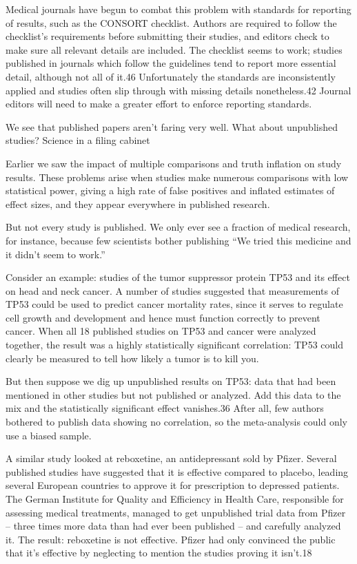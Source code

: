 Medical journals have begun to combat this problem with standards for reporting of results, such as the CONSORT checklist. Authors are required to follow the checklist’s requirements before submitting their studies, and editors check to make sure all relevant details are included. The checklist seems to work; studies published in journals which follow the guidelines tend to report more essential detail, although not all of it.46 Unfortunately the standards are inconsistently applied and studies often slip through with missing details nonetheless.42 Journal editors will need to make a greater effort to enforce reporting standards.

We see that published papers aren’t faring very well. What about unpublished studies?
Science in a filing cabinet

Earlier we saw the impact of multiple comparisons and truth inflation on study results. These problems arise when studies make numerous comparisons with low statistical power, giving a high rate of false positives and inflated estimates of effect sizes, and they appear everywhere in published research.

But not every study is published. We only ever see a fraction of medical research, for instance, because few scientists bother publishing “We tried this medicine and it didn’t seem to work.”

Consider an example: studies of the tumor suppressor protein TP53 and its effect on head and neck cancer. A number of studies suggested that measurements of TP53 could be used to predict cancer mortality rates, since it serves to regulate cell growth and development and hence must function correctly to prevent cancer. When all 18 published studies on TP53 and cancer were analyzed together, the result was a highly statistically significant correlation: TP53 could clearly be measured to tell how likely a tumor is to kill you.

But then suppose we dig up unpublished results on TP53: data that had been mentioned in other studies but not published or analyzed. Add this data to the mix and the statistically significant effect vanishes.36 After all, few authors bothered to publish data showing no correlation, so the meta-analysis could only use a biased sample.

A similar study looked at reboxetine, an antidepressant sold by Pfizer. Several published studies have suggested that it is effective compared to placebo, leading several European countries to approve it for prescription to depressed patients. The German Institute for Quality and Efficiency in Health Care, responsible for assessing medical treatments, managed to get unpublished trial data from Pfizer – three times more data than had ever been published – and carefully analyzed it. The result: reboxetine is not effective. Pfizer had only convinced the public that it’s effective by neglecting to mention the studies proving it isn’t.18

